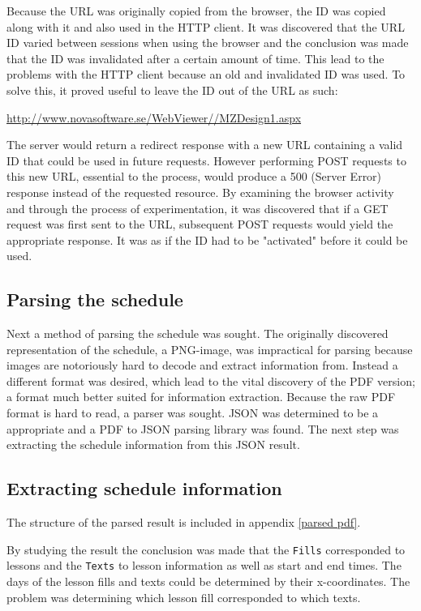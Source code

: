 \documentclass{article}
\begin{document}
	Because the URL was originally copied from the browser, the ID was copied along with it and also used in the HTTP client. It was discovered that the URL ID varied between sessions when using the browser and the conclusion was made that the ID was invalidated after a certain amount of time. This lead to the problems with the HTTP client because an old and invalidated ID was used. To solve this, it proved useful to leave the ID out of the URL as such:
	
	\url{http://www.novasoftware.se/WebViewer//MZDesign1.aspx}
	
	The server would return a redirect response with a new URL containing a valid ID that could be used in future requests. However performing POST requests to this new URL, essential to the process, would produce a 500 (Server Error) response instead of the requested resource. By examining the browser activity and through the process of experimentation, it was discovered that if a GET request was first sent to the URL, subsequent POST requests would yield the appropriate response. It was as if the ID had to be "activated" before it could be used.
	
	\subsection{Parsing the schedule}
	Next a method of parsing the schedule was sought. The originally discovered representation of the schedule, a PNG-image, was impractical for parsing because images are notoriously hard to decode and extract information from. Instead a different format was desired, which lead to the vital discovery of the PDF version; a format much better suited for information extraction. Because the raw PDF format is hard to read, a parser was sought. JSON was determined to be a appropriate and a PDF to JSON parsing library was found. The next step was extracting the schedule information from this JSON result.
	
	\subsection{Extracting schedule information}
	The structure of the parsed result is included in appendix \ref{parsed pdf}.
	
	By studying the result the conclusion was made that the \texttt{Fills} corresponded to lessons and the \texttt{Texts} to lesson information as well as start and end times. The days of the lesson fills and texts could be determined by their x-coordinates. The problem was determining which lesson fill corresponded to which texts.
	\newpage
\end{document}
